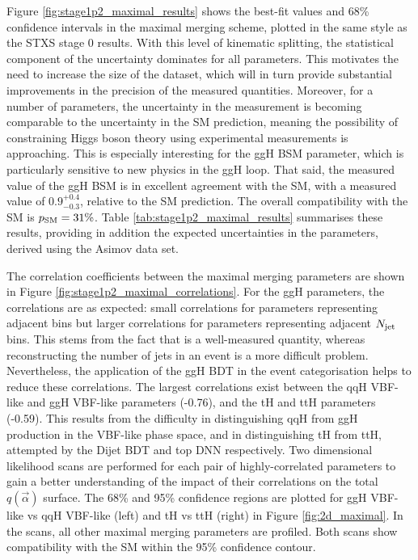 Figure \ref{fig:stage1p2_maximal_results} shows the \xsbr best-fit values and 68\% confidence intervals in the maximal merging scheme, plotted in the same style as the STXS stage 0 results. With this level of kinematic splitting, the statistical component of the uncertainty dominates for all parameters. This motivates the need to increase the size of the dataset, which will in turn provide substantial improvements in the precision of the measured quantities. Moreover, for a number of parameters, the uncertainty in the measurement is becoming comparable to the uncertainty in the SM prediction, meaning the possibility of constraining Higgs boson theory using experimental measurements is approaching. This is especially interesting for the ggH BSM parameter, which is particularly sensitive to new physics in the ggH loop. That said, the measured value of the ggH BSM \xsbr is in excellent agreement with the SM, with a measured value of $0.9^{+0.4}_{-0.3}$, relative to the SM prediction. The overall compatibility with the SM is $p_{\rm{SM}}=31\%$. Table \ref{tab:stage1p2_maximal_results} summarises these results, providing in addition the expected uncertainties in the parameters, derived using the Asimov data set. 

The correlation coefficients between the maximal merging parameters are shown in Figure \ref{fig:stage1p2_maximal_correlations}. For the ggH parameters, the correlations are as expected: small correlations for parameters representing adjacent \ptH bins but larger correlations for parameters representing adjacent $N_{\rm{jet}}$ bins. This stems from the fact that \ptgg is a well-measured quantity, whereas reconstructing the number of jets in an event is a more difficult problem. Nevertheless, the application of the ggH BDT in the event categorisation helps to reduce these correlations. The largest correlations exist between the qqH VBF-like and ggH VBF-like parameters (-0.76), and the tH and ttH parameters (-0.59). This results from the difficulty in distinguishing qqH from ggH production in the VBF-like phase space, and in distinguishing tH from ttH, attempted by the Dijet BDT and top DNN respectively. Two dimensional likelihood scans are performed for each pair of highly-correlated parameters to gain a better understanding of the impact of their correlations on the total $q(\vec{\alpha})$ surface. The 68\% and 95\% confidence regions are plotted for ggH VBF-like vs qqH VBF-like (left) and tH vs ttH (right) in Figure \ref{fig:2d_maximal}. In the scans, all other maximal merging parameters are profiled. Both scans show compatibility with the SM within the 95\% confidence contour.


